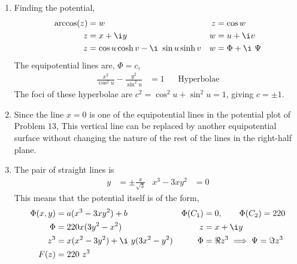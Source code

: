 \begin{enumerate}
    \item Finding the potential,
          \begin{align}
              \arccos(z) & = w                                   &
              z          & = \cos w                                \\
              z          & = x + \i y                            &
              w          & = u + \i v                              \\
              z          & = \cos u \cosh v - \i\ \sin u \sinh v &
              w          & = \Phi + \i\ \Psi
          \end{align}
          The equipotential lines are, $ \Phi = c $,
          \begin{align}
              \frac{x^2}{\cos^2 u} - \frac{y^2}{\sin^2 u} & = 1               &
                                                          & \text{Hyperbolae}
          \end{align}
          The foci of these hyperbolae are $ c^2 = \cos^2 u + \sin^2 u = 1 $, giving
          $ c = \pm 1 $.

    \item Since the line $ x = 0 $ is one of the equipotential lines in the potential
          plot of Problem $ 13 $, This vertical line can be replaced by another
          equipotential surface without changing the nature of the rest of the lines in
          the right-half plane.

    \item The pair of straight lines is
          \begin{align}
              y & = \pm \frac{x}{\sqrt{3}} & x^3 - 3xy^2 & = 0
          \end{align}
          This means that the potential itself is of the form,
          \begin{align}
              \Phi(x, y) & = a(x^3 - 3xy^2) + b                &
              \Phi(C_1)  & = 0, \qquad \Phi(C_2) = 220           \\
              \Phi       & = 220x(3y^2 - x^2)                  &
              z          & = x + \i y                            \\
              z^3        & = x(x^2 - 3y^2) + \i\ y(3x^2 - y^2) &
              \Phi       & = \Re{z^3} \implies \Psi = \Im{z^3}   \\
              F(z)       & = 220\ z^3
          \end{align}

\end{enumerate}